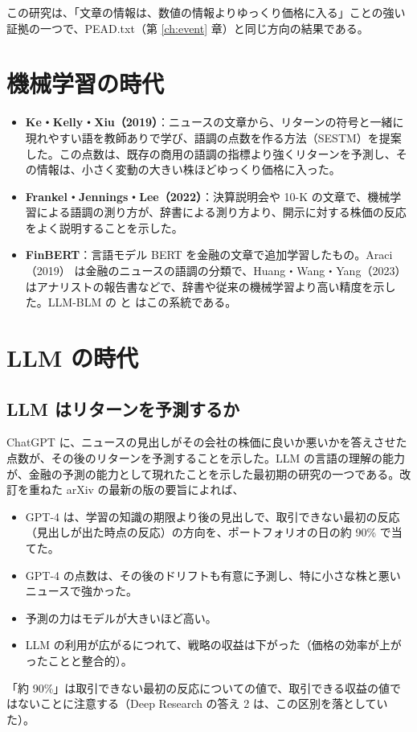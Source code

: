この研究は、「文章の情報は、数値の情報よりゆっくり価格に入る」ことの強い証拠の一つで、PEAD.txt（第 \ref{ch:event} 章）と同じ方向の結果である。

\section{機械学習の時代}

\begin{itemize}
\item \textbf{Ke・Kelly・Xiu（2019）}\cite{kkx2019}：ニュースの文章から、リターンの符号と一緒に現れやすい語を教師ありで学び、語調の点数を作る方法（SESTM）を提案した。この点数は、既存の商用の語調の指標より強くリターンを予測し、その情報は、小さく変動の大きい株ほどゆっくり価格に入った。
\item \textbf{Frankel・Jennings・Lee（2022）}\cite{fjl2022}：決算説明会や 10-K の文章で、機械学習による語調の測り方が、辞書による測り方より、開示に対する株価の反応をよく説明することを示した。
\item \textbf{FinBERT}：言語モデル BERT を金融の文章で追加学習したもの。Araci（2019）\cite{araci2019} は金融のニュースの語調の分類で、Huang・Wang・Yang（2023）\cite{hwy2023} はアナリストの報告書などで、辞書や従来の機械学習より高い精度を示した。LLM-BLM の  と  はこの系統である。
\end{itemize}

\section{LLM の時代}

\subsection{LLM はリターンを予測するか}

\begin{paperbox}
ChatGPT に、ニュースの見出しがその会社の株価に良いか悪いかを答えさせた点数が、その後のリターンを予測することを示した。LLM の言語の理解の能力が、金融の予測の能力として現れたことを示した最初期の研究の一つである。改訂を重ねた arXiv の最新の版の要旨によれば、
\begin{itemize}
\item GPT-4 は、学習の知識の期限より後の見出しで、取引できない最初の反応（見出しが出た時点の反応）の方向を、ポートフォリオの日の約 90\% で当てた。
\item GPT-4 の点数は、その後のドリフトも有意に予測し、特に小さな株と悪いニュースで強かった。
\item 予測の力はモデルが大きいほど高い。
\item LLM の利用が広がるにつれて、戦略の収益は下がった（価格の効率が上がったことと整合的）。
\end{itemize}
「約 90\%」は取引できない最初の反応についての値で、取引できる収益の値ではないことに注意する（Deep Research の答え 2 は、この区別を落としていた）。
\end{paperbox}

